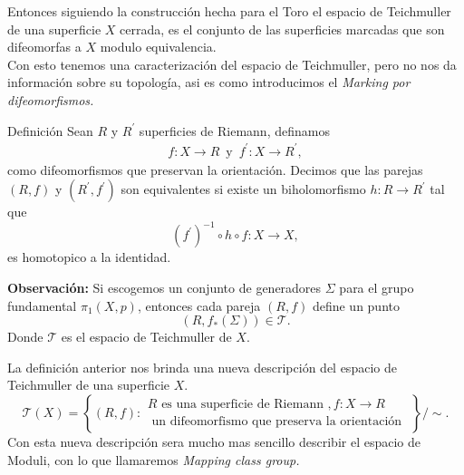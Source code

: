 \documentclass[xcolor=dvipsnames,10pt]{beamer}
\begin{document}
    \begin{frame}
        Entonces siguiendo la construcción hecha para el Toro el espacio de Teichmuller de una superficie $X$ cerrada, es el conjunto de las superficies marcadas que son difeomorfas a $X$ modulo equivalencia.\\
        \vspace{0.3cm}
        Con esto tenemos una caracterización del espacio de Teichmuller, pero no nos da información sobre su topología, asi es como introducimos el \textit{Marking por difeomorfismos.} 
    \end{frame}
    \begin{frame}
        \begin{block}{Definición}
            Sean $R$ y $R^\prime$ superficies de Riemann, definamos
            \begin{align*}
                 f:X\to R\,\text{  y  }\,f^\prime:X\to R^\prime,
             \end{align*} 
             como difeomorfismos que preservan la orientación. Decimos que las parejas $(R,f)$ y $(R^\prime,f^\prime)$ son equivalentes si existe un biholomorfismo $h:R\to R^\prime$ tal que
             $$(f^\prime)^{-1}\circ h\circ f:X\to X,$$
             es homotopico a la identidad.
        \end{block}
        \textbf{Observación:} Si escogemos un conjunto de generadores $\Sigma$ para el grupo fundamental $\pi_1(X,p)$, entonces cada pareja $(R,f)$ define un punto
        $$(R,f_{*}(\Sigma))\in \mathcal{T}.$$
        Donde $\mathcal{T}$ es el espacio de Teichmuller de $X.$
        
    \end{frame}
    \begin{frame}
        La definición anterior nos brinda una nueva descripción del espacio de Teichmuller de una superficie $X.$
        $$\mathcal{T}(X)=\left\{(R, f): \begin{array}{c}R \text{ es una superficie de Riemann }, f: X \rightarrow R \\ \text{ un difeomorfismo que preserva la orientación }\end{array}\right\} / \sim.$$
        Con esta nueva descripción sera mucho mas sencillo describir el espacio de Moduli, con lo que llamaremos \textit{Mapping class group.}
    \end{frame}
\end{document}

